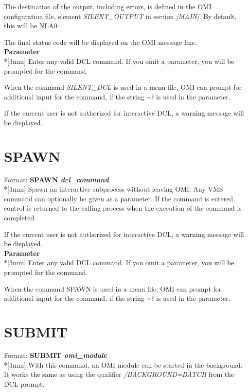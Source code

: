 \documentclass[a4paper]{book}
\renewcommand{\indent}{\hspace*{5mm}}
\begin{document}
The destination of the output, including errors, is defined in the OMI 
configuration file, element \textsl{SILENT{\_}OUTPUT} in section \textsl{[MAIN]}. By default, 
this will be NLA0:

The final status code will be displayed on the OMI message line.\\[3mm]
\textbf{Parameter}\\*[3mm]
Enter any valid DCL command. If you omit a parameter, you will be prompted 
for the command.

When the command \textsl{SILENT{\_}DCL} is used in a menu file, OMI can prompt for 
additional input for the command, if the string \textsl{\~{}?} is used in the parameter.

If the current user is not authorized for interactive DCL, a warning message 
will be displayed.

\section{SPAWN}
\label{subsec:spawn}

\indent Format: \textbf{SPAWN \textit{dcl{\_}command}}\\*[3mm]
Spawn an interactive subprocess without leaving OMI. Any VMS command can 
optionally be given as a parameter. If the command is entered, control is 
returned to the calling process when the execution of the command is 
completed.

If the current user is not authorized for interactive DCL, a warning message 
will be displayed.\\[3mm]
\textbf{Parameter}\\*[3mm]
Enter any valid DCL command. If you omit a parameter, you will be prompted 
for the command.

When the command SPAWN is used in a menu file, OMI can prompt for additional 
input for the command, if the string \textsl{\~{}?} is used in the parameter.

\section{SUBMIT}
\label{subsec:submit}

\indent Format: \textbf{SUBMIT \textit{omi{\_}module}}\\*[3mm]
With this command, an OMI module can be started in the background. It works 
the same as using the qualifier \textsl{/BACKGROUND=BATCH} from the DCL 
prompt.
\end{document}
